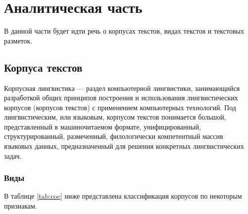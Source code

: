 \section{Аналитическая часть}

В данной части будет идти речь о корпусах текстов, видах текстов и текстовых разметок. %

\subsection{Корпуса текстов}

Корпусная лингвистика --- раздел компьютерной лингвистики, занимающийся разработкой общих принципов построения и использования лингвистических корпусов (корпусов текстов) с применением компьютерных технологий.
Под лингвистическим, или языковым, корпусом текстов понимается большой, представленный в машиночитаемом формате, унифицированный, структурированный, размеченный, филологически компетентный массив языковых данных, предназначенный для решения конкретных лингвистических задач. \cite[с. 5]{cl}

\subsubsection{Виды}

В таблице \ref{tab:coc} ниже представлена классификация корпусов по некоторым признакам.

